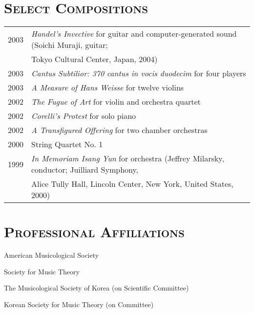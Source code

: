 \documentclass[a4paper,11pt,draft]{article}
\begin{document}
  \section*{\textsc{Select Compositions}}
  
  \hspace*{-0.25cm}
  \begin{tabular}{p{2.5cm} p{12.5cm}}
    2003 & \textit{Handel’s Invective} for guitar and computer-generated sound
    (Soichi Muraji, guitar;\\
    & Tokyo Cultural Center, Japan, 2004)\\[2mm]
    
    2003 & \textit{Cantus Subtilior: 370 cantus in vocis duodecim} for four
    players\\[2mm]
    
    2003 & \textit{A Measure of Hans Weisse} for twelve violins\\[2mm]
    
    2002 & \textit{The Fugue of Art} for violin and orchestra quartet\\[2mm]
    
    2002 & \textit{Corelli’s Protest} for solo piano\\[2mm]
    
    2002 & \textit{A Transfigured Offering} for two chamber orchestras\\[2mm]
    
    2000 & String Quartet No. 1\\[2mm]
    
    1999 & \textit{In Memoriam Isang Yun} for orchestra (Jeffrey Milarsky,
    conductor; Juilliard Symphony,\\
    & Alice Tully Hall, Lincoln Center, New York, United States, 2000)
  \end{tabular}
  
  \vspace{2.5mm}
  
  \section*{\textsc{Professional Affiliations}}
  
  American Musicological Society
  
  \noindent Society for Music Theory
  
  \noindent The Musicological Society of Korea (on Scientific Committee)
  
  \noindent Korean Society for Music Theory (on Committee)
  
\end{document}
